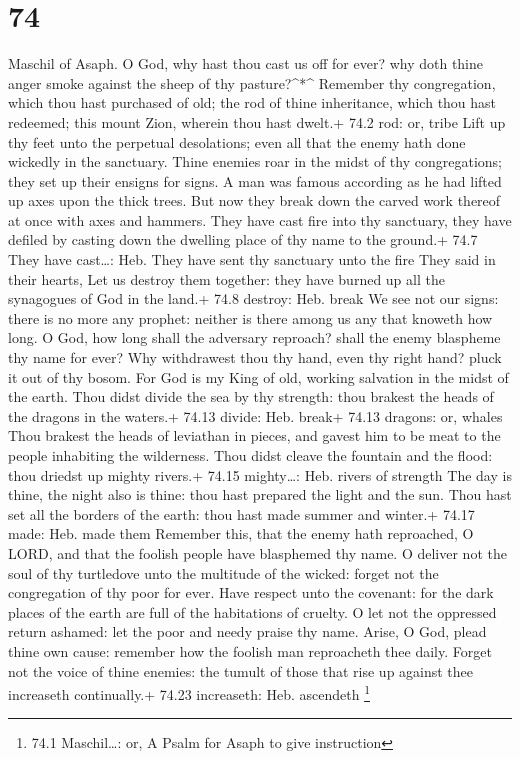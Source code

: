 \hypertarget{section-73}{%
\section{74}\label{section-73}}

Maschil of Asaph.  O God, why hast thou cast us off for
ever? why doth thine anger smoke against the sheep of thy
pasture?\^{}*\^{}  Remember thy congregation, which thou
hast purchased of old; the rod of thine inheritance, which thou hast
redeemed; this mount Zion, wherein thou hast dwelt.+ 74.2 rod: or, tribe
 Lift up thy feet unto the perpetual desolations; even all
that the enemy hath done wickedly in the sanctuary.  Thine
enemies roar in the midst of thy congregations; they set up their
ensigns for signs.  A man was famous according as he had
lifted up axes upon the thick trees.  But now they break
down the carved work thereof at once with axes and hammers. 
They have cast fire into thy sanctuary, they have defiled by casting
down the dwelling place of thy name to the ground.+ 74.7 They have
cast\ldots: Heb. They have sent thy sanctuary unto the fire 
They said in their hearts, Let us destroy them together: they have
burned up all the synagogues of God in the land.+ 74.8 destroy: Heb.
break  We see not our signs: there is no more any prophet:
neither is there among us any that knoweth how long.  O
God, how long shall the adversary reproach? shall the enemy blaspheme
thy name for ever?  Why withdrawest thou thy hand, even thy
right hand? pluck it out of thy bosom.  For God is my King
of old, working salvation in the midst of the earth.  Thou
didst divide the sea by thy strength: thou brakest the heads of the
dragons in the waters.+ 74.13 divide: Heb. break+ 74.13 dragons: or,
whales  Thou brakest the heads of leviathan in pieces, and
gavest him to be meat to the people inhabiting the wilderness.
 Thou didst cleave the fountain and the flood: thou driedst
up mighty rivers.+ 74.15 mighty\ldots: Heb. rivers of strength
 The day is thine, the night also is thine: thou hast
prepared the light and the sun.  Thou hast set all the
borders of the earth: thou hast made summer and winter.+ 74.17 made:
Heb. made them  Remember this, that the enemy hath
reproached, O LORD, and that the foolish people have blasphemed thy
name.  O deliver not the soul of thy turtledove unto the
multitude of the wicked: forget not the congregation of thy poor for
ever.  Have respect unto the covenant: for the dark places
of the earth are full of the habitations of cruelty.  O let
not the oppressed return ashamed: let the poor and needy praise thy
name.  Arise, O God, plead thine own cause: remember how
the foolish man reproacheth thee daily.  Forget not the
voice of thine enemies: the tumult of those that rise up against thee
increaseth continually.+ 74.23 increaseth: Heb. ascendeth \footnote{74.1
  Maschil\ldots: or, A Psalm for Asaph to give instruction}

